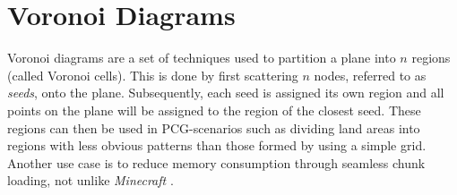 \section{Voronoi Diagrams}

Voronoi diagrams are a set of techniques used to partition a plane into $n$ regions (called Voronoi cells).
This is done by first scattering $n$ nodes, referred to as \textit{seeds}, onto the plane.
Subsequently, each seed is assigned its own region and all points on the plane will be assigned to the region of the closest seed.
These regions can then be used in PCG-scenarios such as dividing land areas into regions with less obvious patterns than those formed by using a simple grid.
Another use case is to reduce memory consumption through seamless chunk loading, not unlike \textit{Minecraft} \cite{minecraft}.

